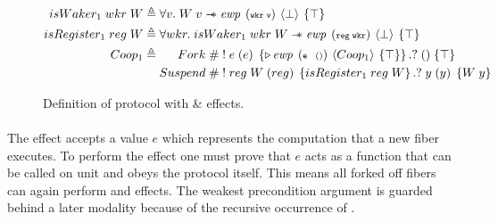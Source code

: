 \begin{figure}[ht]
  \begin{align*}
    \gsIsWaker{1}\; wkr\; W & \triangleq \forall v.   \;  W\; v \wand{} \ewp{wkr\; v}{\bot}{\top}\label{spec:is_waker}                                                  \\
    \gsIsReg{1}\; reg\; W   & \triangleq \forall wkr. \; \gsIsWaker{1}\; wkr\; W \wand{} \ewp{reg\; wkr}{\bot}{\top}                                                    \\
    \proto{1}               & \triangleq \begin{aligned}[t]
                                           Fork\;    & \# \; !\; e\; (e)\; \left\{\later \ewp{e\ \ ()}{\proto{1}}{\top}\right\}. ?\; ()\; \{ \top \}           \\
                                           Suspend\; & \# \; !\; reg\; W\; (reg)\; \left\{\gsIsReg{1}\; reg\; W\right\}.?\; y\; (y)\; \left\{ W\; y \right\}
                                         \end{aligned}
  \end{align*}
  \caption{Definition of  protocol with \efork{} \& \esuspend{} effects.}
  \label{fig:coop-protocol-1}\label{spec:suspend}
\end{figure}

\paragraph*{\efork{}}
The \efork{} effect accepts a value \(e\) which represents the computation that a new fiber executes.
To perform the effect one must prove that \(e\) acts as a function that can be called on unit and obeys the  protocol itself.
This means all forked off fibers can again perform \efork{} and \esuspend{} effects.
The weakest precondition argument is guarded behind a later modality because of the recursive occurrence of .

